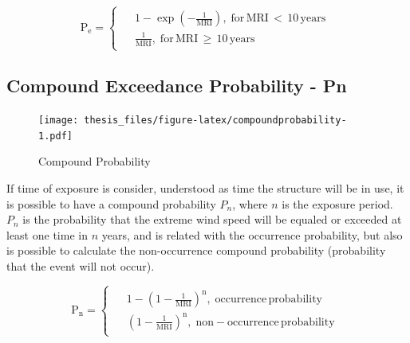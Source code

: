 \documentclass[12pt,oneside]{reedthesis}
\begin{document}
\[
  \mathrm{
    P_e = 
    \begin{cases}
      \begin{split}
            &1-\exp\left(-\frac{1}{MRI}\right),\;for\,MRI\,<\,10\,years
            \\
            &\frac{1}{MRI},\;for\,MRI\,\geq\,10\,years      
      \end{split}
    \end{cases}
  }
\]

\hypertarget{compound-exceedance-probability---pn}{%
\subsection{Compound Exceedance Probability - Pn}\label{compound-exceedance-probability---pn}}

\footnotesize
\begin{figure}
\centering
\texttt{[image: thesis\_files/figure-latex/compoundprobability-1.pdf]}
\caption{\label{fig:compoundprobability}Compound Probability}
\end{figure}
\normalsize

If time of exposure is consider, understood as time the structure will be in use, it is possible to have a compound probability \(P_n\), where \(n\) is the exposure period. \(P_n\) is the probability that the extreme wind speed will be equaled or exceeded at least one time in \(n\) years, and is related with the occurrence probability, but also is possible to calculate the non-occurrence compound probability (probability that the event will not occur).

\[
  \mathrm{
    P_n = 
    \begin{cases}
      \begin{split}
            &1-\left(1-\frac{1}{MRI}\right)^n,\;occurrence\,probability
            \\
            &\left(1-\frac{1}{MRI}\right)^n,\;non-occurrence\,probability
      \end{split}
    \end{cases}
  }
\]
\end{document}
